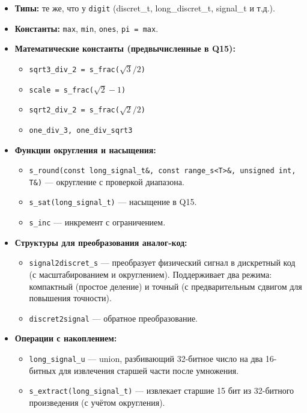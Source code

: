 \documentclass[a4paper,12pt]{article}
\begin{document}
\begin{itemize}
    \item \textbf{Типы:} те же, что у \texttt{digit} (discret\_t, long\_discret\_t, signal\_t и т.д.).
    \item \textbf{Константы:} \texttt{max}, \texttt{min}, \texttt{ones}, \texttt{pi = max}.
    \item \textbf{Математические константы (предвычисленные в Q15):}
        \begin{itemize}
            \item \texttt{sqrt3\_div\_2 = s\_frac($\sqrt{3}/2$)}
            \item \texttt{scale = s\_frac($\sqrt{2}-1$)}
            \item \texttt{sqrt2\_div\_2 = s\_frac($\sqrt{2}/2$)}
            \item \texttt{one\_div\_3, one\_div\_sqrt3}
        \end{itemize}
    \item \textbf{Функции округления и насыщения:}
        \begin{itemize}
            \item \texttt{s\_round(const long\_signal\_t\&, const range\_s<T>\&, unsigned int, T\&)} — округление с проверкой диапазона.
            \item \texttt{s\_sat(long\_signal\_t)} — насыщение в Q15.
            \item \texttt{s\_inc} — инкремент с ограничением.
        \end{itemize}
    \item \textbf{Структуры для преобразования аналог-код:}
        \begin{itemize}
            \item \texttt{signal2discret\_s} — преобразует физический сигнал в дискретный код (с масштабированием и округлением). Поддерживает два режима: компактный (простое деление) и точный (с предварительным сдвигом для повышения точности).
            \item \texttt{discret2signal} — обратное преобразование.
        \end{itemize}
    \item \textbf{Операции с накоплением:}
        \begin{itemize}
            \item \texttt{long\_signal\_u} — union, разбивающий 32-битное число на два 16-битных для извлечения старшей части после умножения.
            \item \texttt{s\_extract(long\_signal\_t)} — извлекает старшие 15 бит из 32-битного произведения (с учётом округления).

\end{itemize}
\end{itemize}
\end{document}
